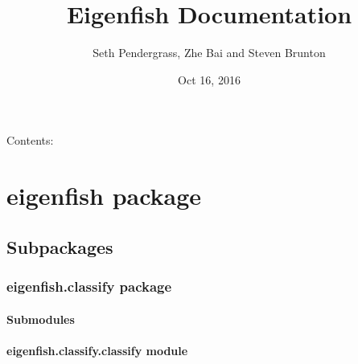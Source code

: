 \documentclass[letterpaper,10pt,english]{sphinxmanual}
\title{Eigenfish Documentation}
\date{Oct 16, 2016}
\author{Seth Pendergrass, Zhe Bai and Steven Brunton}
\begin{document}
\maketitle
\tableofcontents
{}\label{index::doc}


Contents:


\chapter{eigenfish package}
\label{eigenfish:eigenfish-package}\label{eigenfish::doc}\label{eigenfish:welcome-to-eigenfish-s-documentation}

\section{Subpackages}
\label{eigenfish:subpackages}

\subsection{eigenfish.classify package}
\label{eigenfish.classify::doc}\label{eigenfish.classify:eigenfish-classify-package}

\subsubsection{Submodules}
\label{eigenfish.classify:submodules}

\subsubsection{eigenfish.classify.classify module}
\label{eigenfish.classify:module-eigenfish.classify.classify}\label{eigenfish.classify:eigenfish-classify-classify-module}
\end{document}
